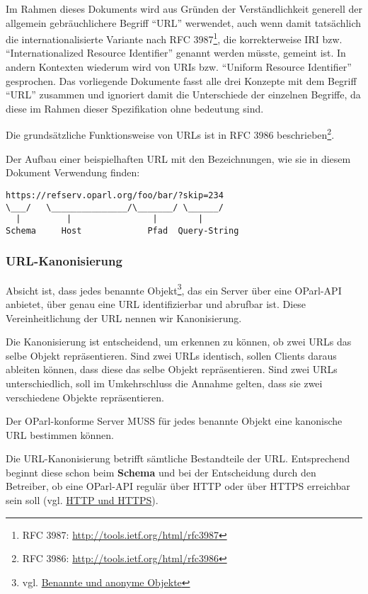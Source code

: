 \documentclass[,a4paper]{article}
\begin{document}
Im Rahmen dieses Dokuments wird aus Gründen der Verständlichkeit
generell der allgemein gebräuchlichere Begriff ``URL'' werwendet, auch
wenn damit tatsächlich die internationalisierte Variante nach RFC
3987\footnote{RFC 3987: \url{http://tools.ietf.org/html/rfc3987}}, die
korrekterweise IRI bzw. ``Internationalized Resource Identifier''
genannt werden müsste, gemeint ist. In andern Kontexten wiederum wird
von URIs bzw. ``Uniform Resource Identifier'' gesprochen. Das
vorliegende Dokumente fasst alle drei Konzepte mit dem Begriff ``URL''
zusammen und ignoriert damit die Unterschiede der einzelnen Begriffe, da
diese im Rahmen dieser Spezifikation ohne bedeutung sind.

Die grundsätzliche Funktionsweise von URLs ist in RFC 3986
beschrieben\footnote{RFC 3986: \url{http://tools.ietf.org/html/rfc3986}}.

Der Aufbau einer beispielhaften URL mit den Bezeichnungen, wie sie in
diesem Dokument Verwendung finden:

\begin{verbatim}
https://refserv.oparl.org/foo/bar/?skip=234
\___/   \_______________/\_______/ \______/
  |         |                |        |
Schema     Host             Pfad  Query-String
\end{verbatim}

\subsubsection{URL-Kanonisierung}\label{url-kanonisierung}

Absicht ist, dass jedes benannte Objekt\footnote{vgl.
  \hyperref[benannteux5fanonymeux5fobjekte]{Benannte und anonyme
  Objekte}}, das ein Server über eine OParl-API anbietet, über genau
eine URL identifizierbar und abrufbar ist. Diese Vereinheitlichung der
URL nennen wir Kanonisierung.

Die Kanonisierung ist entscheidend, um erkennen zu können, ob zwei URLs
das selbe Objekt repräsentieren. Sind zwei URLs identisch, sollen
Clients daraus ableiten können, dass diese das selbe Objekt
repräsentieren. Sind zwei URLs unterschiedlich, soll im Umkehrschluss
die Annahme gelten, dass sie zwei verschiedene Objekte repräsentieren.

Der OParl-konforme Server MUSS für jedes benannte Objekt eine kanonische
URL bestimmen können.

Die URL-Kanonisierung betrifft sämtliche Bestandteile der URL.
Entsprechend beginnt diese schon beim \textbf{Schema} und bei der
Entscheidung durch den Betreiber, ob eine OParl-API regulär über HTTP
oder über HTTPS erreichbar sein soll (vgl.
\hyperref[http-und-https]{HTTP und HTTPS}).
\end{document}
